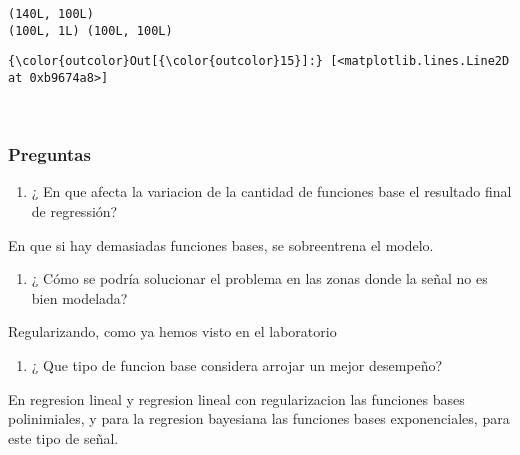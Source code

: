 \documentclass[11pt]{article}
\providecommand{\tightlist}{%
      \setlength{\itemsep}{0pt}\setlength{\parskip}{0pt}}
\begin{document}
    \begin{Verbatim}[commandchars=\\\{\}]
(140L, 100L)
(100L, 1L) (100L, 100L)

    \end{Verbatim}

\begin{Verbatim}[commandchars=\\\{\}]
{\color{outcolor}Out[{\color{outcolor}15}]:} [<matplotlib.lines.Line2D at 0xb9674a8>]
\end{Verbatim}
            
    \begin{center}
    \end{center}
    { \hspace*{\fill} \\}
    
    \subsubsection{Preguntas}\label{preguntas}

\begin{enumerate}
\def\labelenumi{\alph{enumi}.}
\tightlist
\item
  ¿ En que afecta la variacion de la cantidad de funciones base el
  resultado final de regressión?
\end{enumerate}

    En que si hay demasiadas funciones bases, se sobreentrena el modelo.

    \begin{enumerate}
\def\labelenumi{\alph{enumi}.}
\setcounter{enumi}{1}
\tightlist
\item
  ¿ Cómo se podría solucionar el problema en las zonas donde la señal no
  es bien modelada?
\end{enumerate}

    Regularizando, como ya hemos visto en el laboratorio

    \begin{enumerate}
\def\labelenumi{\alph{enumi}.}
\setcounter{enumi}{2}
\tightlist
\item
  ¿ Que tipo de funcion base considera arrojar un mejor desempeño?
\end{enumerate}

    En regresion lineal y regresion lineal con regularizacion las funciones
bases polinimiales, y para la regresion bayesiana las funciones bases
exponenciales, para este tipo de señal.


    
    
    
    
\end{document}
